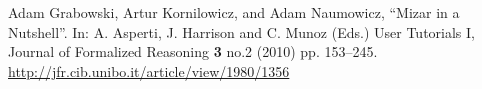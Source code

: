 \begin{thebibliography}{99}
  Adam Grabowski, Artur Kornilowicz, and Adam Naumowicz,
  ``Mizar in a Nutshell''.
  In: A. Asperti, J. Harrison and C. Munoz (Eds.) User Tutorials I,
  Journal of Formalized Reasoning \textbf{3} no.2 (2010) pp. 153--245. 
  \url{http://jfr.cib.unibo.it/article/view/1980/1356}
\end{thebibliography}